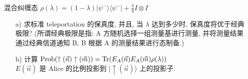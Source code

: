 \documentclass{assignment}
\begin{document}
\begin{prob}
    混合纠缠态 $\rho(\lambda)=(1-\lambda)\lvert\psi^-\rangle\langle\psi^-\rvert+\frac{\lambda}{4}I\otimes I$
    \begin{itemize}
        \item[a)] 求标准 teleportation 的保真度, 并且, 当 $\lambda$ 达到多少时, 保真度将优于经典极限? (所谓经典极限是指: A 方随机选择一组测量基进行测量, 并将测量结果通过经典信道通知 B, B 根据 A 的测量结果进行态制备.)
        \item[b)] 计算 $\text{Prob}(\uparrow(\vec{n})\uparrow(\vec{m}))=\operatorname{Tr}(E_A(\vec{n})E_A(\vec{m})\rho(\lambda))$\\
        $E(\vec{n})$ 是 Alice 的比例投影到 $\lvert\uparrow(\vec{n})\rangle$ 上的投影子.
    \end{itemize}
\end{prob}
\end{document}
